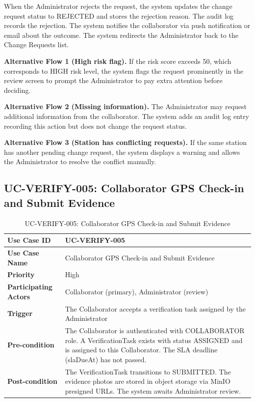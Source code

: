 \documentclass[../Main.tex]{subfiles}
\begin{document}
When the Administrator rejects the request, the system updates the change request status to REJECTED and stores the rejection reason. The audit log records the rejection. The system notifies the collaborator via push notification or email about the outcome. The system redirects the Administrator back to the Change Requests list.

\textbf{Alternative Flow 1 (High risk flag).} If the risk score exceeds 50, which corresponds to HIGH risk level, the system flags the request prominently in the review screen to prompt the Administrator to pay extra attention before deciding.

\textbf{Alternative Flow 2 (Missing information).} The Administrator may request additional information from the collaborator. The system adds an audit log entry recording this action but does not change the request status.

\textbf{Alternative Flow 3 (Station has conflicting requests).} If the same station has another pending change request, the system displays a warning and allows the Administrator to resolve the conflict manually.

\subsection{UC-VERIFY-005: Collaborator GPS Check-in and Submit Evidence}
\label{subsection:2.3.5}

\begin{table}[H]
\caption{UC-VERIFY-005: Collaborator GPS Check-in and Submit Evidence}
\label{table:uc-verify-005}
\begin{tabular}{|p{3.5cm}|p{12cm}|}
\hline
\textbf{Use Case ID} & UC-VERIFY-005 \\ \hline
\textbf{Use Case Name} & Collaborator GPS Check-in and Submit Evidence \\ \hline
\textbf{Priority} & High \\ \hline
\textbf{Participating Actors} & Collaborator (primary), Administrator (review) \\ \hline
\textbf{Trigger} & The Collaborator accepts a verification task assigned by the Administrator \\ \hline
\textbf{Pre-condition} & The Collaborator is authenticated with COLLABORATOR role. A VerificationTask exists with status ASSIGNED and is assigned to this Collaborator. The SLA deadline (slaDueAt) has not passed. \\ \hline
\textbf{Post-condition} & The VerificationTask transitions to SUBMITTED. The evidence photos are stored in object storage via MinIO presigned URLs. The system awaits Administrator review. \\ \hline
\end{tabular}
\end{table}
\end{document}
